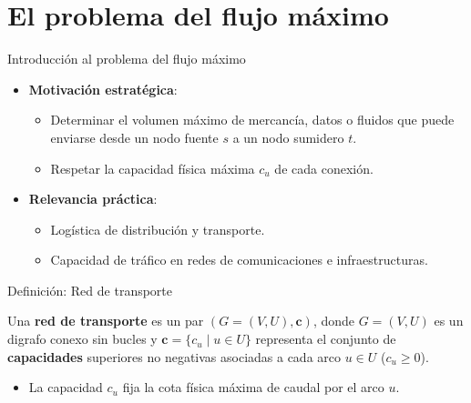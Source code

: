 \documentclass[
  ignorenonframetext,
]{beamer}
\providecommand{\tightlist}{%
  \setlength{\itemsep}{0pt}\setlength{\parskip}{0pt}}
\begin{document}
\section{El problema del flujo
máximo}\label{el-problema-del-flujo-muxe1ximo}

\begin{frame}{Introducción al problema del flujo máximo}
\label{introducciuxf3n-al-problema-del-flujo-muxe1ximo}
\begin{itemize}
\tightlist
\item
  \textbf{Motivación estratégica}:

  \begin{itemize}
  \tightlist
  \item
    Determinar el volumen máximo de mercancía, datos o fluidos que puede
    enviarse desde un nodo fuente \(s\) a un nodo sumidero \(t\).
  \item
    Respetar la capacidad física máxima \(c_u\) de cada conexión.
  \end{itemize}
\item
  \textbf{Relevancia práctica}:

  \begin{itemize}
  \tightlist
  \item
    Logística de distribución y transporte.
  \item
    Capacidad de tráfico en redes de comunicaciones e infraestructuras.
  \end{itemize}
\end{itemize}
\end{frame}

\begin{frame}{Definición: Red de transporte}
\label{definiciuxf3n-red-de-transporte}
\begin{tcolorbox}[enhanced jigsaw, opacityback=0, breakable, title=\textcolor{quarto-callout-note-color}{\faInfo}\hspace{0.5em}{Red de transporte}, colback=white, colbacktitle=quarto-callout-note-color!10!white, bottomrule=.15mm, opacitybacktitle=0.6, coltitle=black, bottomtitle=1mm, leftrule=.75mm, colframe=quarto-callout-note-color-frame, toptitle=1mm, titlerule=0mm, rightrule=.15mm, left=2mm, arc=.35mm, toprule=.15mm]

Una \textbf{red de transporte} es un par \((G = (V, U), \mathbf{c})\),
donde \(G = (V, U)\) es un digrafo conexo sin bucles y
\(\mathbf{c} = \{c_u \mid u \in U\}\) representa el conjunto de
\textbf{capacidades} superiores no negativas asociadas a cada arco
\(u \in U\) (\(c_u \ge 0\)).

\end{tcolorbox}

\begin{itemize}
\tightlist
\item
  La capacidad \(c_u\) fija la cota física máxima de caudal por el arco
  \(u\).
\end{itemize}
\end{frame}
\end{document}
